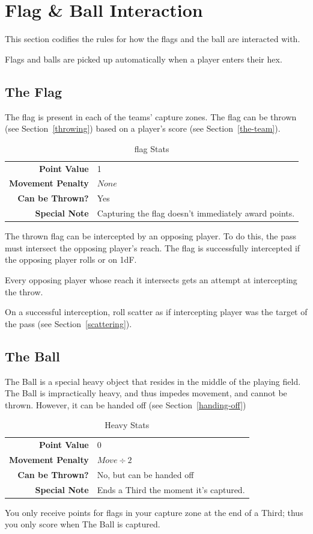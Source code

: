 \section{Flag \& Ball Interaction} \label{flag-interaction}
This section codifies the rules for how the flags and the ball are interacted with.

Flags and balls are picked up automatically when a player enters their hex.

\subsection{The Flag}
The flag is present in each of the teams' capture zones.
The flag can be thrown (see Section~\ref{throwing}) based on a player's \throw{} score (see Section~\ref{the-team}).

\begin{table}[!ht]
    \centering
\begin{tabular}{r|l}
    \textbf{Point Value} & 1 \\
    \textbf{Movement Penalty} & $None$ \\
    \textbf{Can be Thrown?} & Yes \\
    \textbf{Special Note} & Capturing the flag doesn't immediately award points. \\
\end{tabular} 
    \caption{flag Stats}
    \label{tab:flag}
\end{table}
The thrown flag can be intercepted by an opposing player.
To do this, the pass must intersect the opposing player's reach.
The flag is successfully intercepted if the opposing player rolls \blank{} or \plus{} on 1dF.

Every opposing player whose reach it intersects gets an attempt at intercepting the throw.

On a successful interception, roll scatter as if intercepting player was the target of the pass (see Section~\ref{scattering}).

\subsection{The Ball}
The Ball is a special heavy object that resides in the middle of the playing field.
The Ball is impractically heavy, and thus impedes movement, and cannot be thrown.
However, it can be handed off (see Section~\ref{handing-off})

\begin{table}[!ht]
    \centering
\begin{tabular}{r|l}
    \textbf{Point Value} & $0$ \\
    \textbf{Movement Penalty} & $Move\div 2$ \\
    \textbf{Can be Thrown?} & No, but can be handed off \\
    \textbf{Special Note} & Ends a Third the moment it’s captured.\\
\end{tabular}
    \caption{Heavy Stats}
    \label{tab:heavy}
\end{table}
You only receive points for flags in your capture zone at the end of a Third; thus you only score when The Ball is captured.

